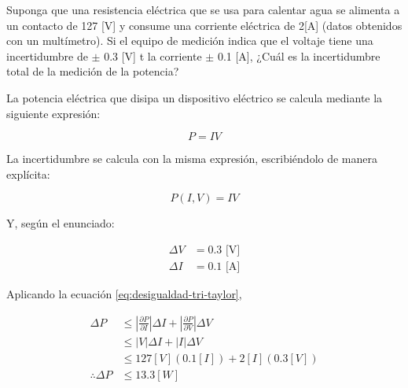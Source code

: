 \begin{ex}

	Suponga que una resistencia eléctrica que se usa para calentar agua se
	alimenta a un contacto de 127 [V] y consume una corriente eléctrica de
	2[A] (datos obtenidos con un multímetro). Si el equipo de medición
	indica que el voltaje tiene una incertidumbre de $\pm$ 0.3 [V] t la
	corriente $\pm$ 0.1 [A], ¿Cuál es la incertidumbre total de la medición de
	la potencia?

	\begin{solution}
		La potencia eléctrica que disipa un dispositivo eléctrico se
		calcula mediante la siguiente expresión:

		\begin{equation*}
			P = IV
		\end{equation*}

		La incertidumbre se calcula con la misma expresión,
		escribiéndolo de manera explícita:

		\begin{equation*}
			P(I, V) = IV
		\end{equation*}

		Y, según el enunciado:

		\begin{align*}
			\Delta V &= 0.3 \text{ [V]} \\
			\Delta I &= 0.1 \text{ [A]}
		\end{align*}


		Aplicando la ecuación \ref{eq:desigualdad-tri-taylor},

		\begin{align*}
			\Delta P &\leq
			\left| \frac{\partial P}{\partial I} \right| \Delta I +
			\left| \frac{\partial P}{\partial V} \right| \Delta V \\
				 &\leq \left| V \right| \Delta I + \left| I\right|
				 \Delta V \\
				 &\leq 127 [V](0.1 [I]) + 2 [I](0.3 [V]) \\
			\therefore \Delta P &\leq 13.3 [W]
		\end{align*}
	\end{solution}
\end{ex}


